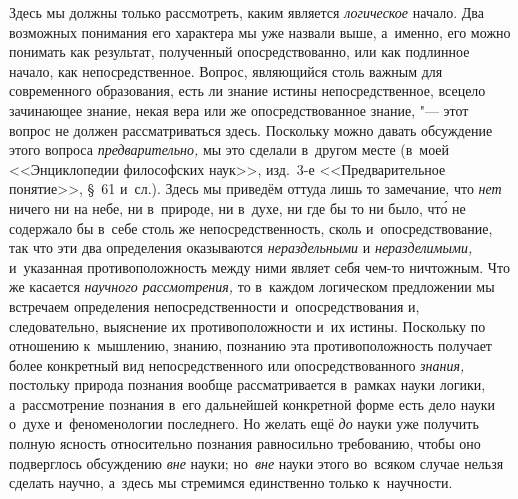 Здесь мы должны только рассмотреть, каким является {\em логическое} начало. Два
возможных понимания его характера мы уже назвали выше, а~именно, его можно
понимать как результат, полученный опосредствованно, или как подлинное начало,
как непосредственное. Вопрос, являющийся столь важным для современного
образования, есть ли знание истины непосредственное, всецело зачинающее знание,
некая вера или же опосредствованное знание, "--- этот вопрос не должен
рассматриваться здесь. Поскольку можно давать обсуждение этого вопроса
{\em предварительно,} мы это сделали в~другом месте (в~моей <<Энциклопедии
философских наук>>, изд.~3-е <<Предварительное понятие>>, \S~61 и~сл.). Здесь
мы приведём оттуда лишь то замечание, что {\em нет} ничего ни на небе, ни
в~природе, ни в~духе, ни где бы то ни было, чт\'{о} не содержало бы в~себе
столь же непосредственность, сколь и~опосредствование, так что эти два
определения оказываются {\em нераздельными} и {\em неразделимыми,} и~указанная
противоположность между ними являет себя чем-то ничтожным. Что же касается
{\em научного рассмотрения,} то в~каждом логическом предложении мы встречаем
определения непосредственности и~опосредствования и, следовательно, выяснение
их противоположности и~их истины. Поскольку по отношению к~мышлению, знанию,
познанию эта противоположность получает более конкретный вид непосредственного
или опосредствованного {\em знания,} постольку природа познания вообще
рассматривается в~рамках науки логики, а~рассмотрение познания в~его дальнейшей
конкретной форме есть дело науки о~духе и~феноменологии последнего. Но желать
ещё {\em до} науки уже получить полную ясность относительно познания
равносильно требованию, чтобы оно подверглось обсуждению {\em вне} науки;
но~{\em вне} науки этого во~всяком случае нельзя сделать научно, а~здесь мы
стремимся единственно только к~научности.

